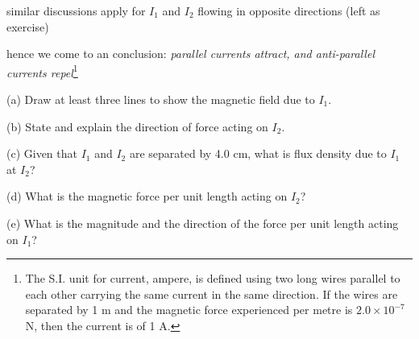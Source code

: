similar discussions apply for $I_1$ and $I_2$ flowing in opposite directions (left as exercise)

hence we come to an conclusion: \emph{parallel currents attract, and anti-parallel currents repel}\footnote{The S.I. unit for current, ampere, is defined using two long wires parallel to each other carrying the same current in the same direction. If the wires are separated by 1 m and the magnetic force experienced per metre is $2.0\times10^{-7}$ N, then the current is of 1 A.}


\label{q-pwires}



\begin{figure}[htp]
\centering
{}
\end{figure}

\begin{compactenum}
\item[(a)] Draw at least three lines to show the magnetic field due to $I_1$.

\item[(b)] State and explain the direction of force acting on $I_2$.

\item[(c)] Given that $I_1$ and $I_2$ are separated by 4.0 cm, what is flux density due to $I_1$ at $I_2$?

\item[(d)]  What is the magnetic force per unit length acting on $I_2$?

\item[(e)] What is the magnitude and the direction of the force per unit length acting on $I_1$?
	
\end{compactenum}

